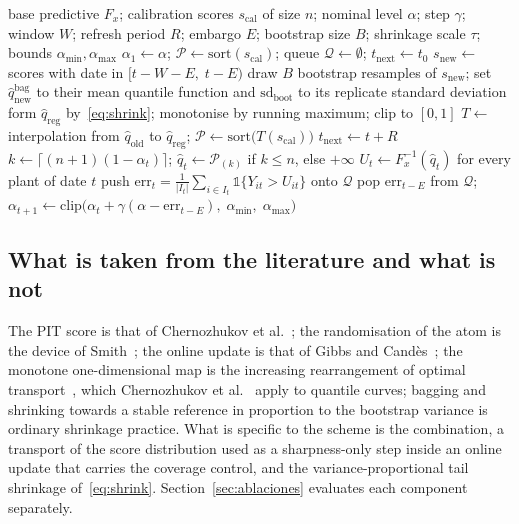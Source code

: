 \begin{algorithm}[t]
\caption{Transport + ACI with tail shrinkage. Constants and seeds in \ref{app:hiper}.}
\label{alg:transporte}
\begin{algorithmic}[1]
\Require base predictive $F_x$; calibration scores $s_{\mathrm{cal}}$ of size $n$; nominal level $\alpha$; step $\gamma$; window $W$; refresh period $R$; embargo $E$; bootstrap size $B$; shrinkage scale $\tau$; bounds $\alpha_{\min},\alpha_{\max}$
\State $\alpha_1\gets\alpha$; \; $\mathcal{P}\gets\mathrm{sort}(s_{\mathrm{cal}})$; \; queue $\mathcal{Q}\gets\emptyset$; \; $t_{\mathrm{next}}\gets t_0$
     \State $s_{\mathrm{new}}\gets$ scores with date in $[t-W-E,\;t-E)$
        \State draw $B$ bootstrap resamples of $s_{\mathrm{new}}$; set $\hat q^{\mathrm{bag}}_{\mathrm{new}}$ to their mean quantile function and $\mathrm{sd}_{\mathrm{boot}}$ to its replicate standard deviation
        \State form $\hat q_{\mathrm{reg}}$ by~\eqref{eq:shrink}; monotonise by running maximum; clip to $[0,1]$
        \State $T\gets$ interpolation from $\hat q_{\mathrm{old}}$ to $\hat q_{\mathrm{reg}}$; \; $\mathcal{P}\gets\mathrm{sort}\big(T(s_{\mathrm{cal}})\big)$
     \EndIf
     \State $t_{\mathrm{next}}\gets t+R$
  \EndIf
  \State $k\gets\lceil (n+1)(1-\alpha_t)\rceil$; \; $\hat q_t\gets \mathcal{P}_{(k)}$ if $k\le n$, else $+\infty$
  \State $U_t\gets F_x^{-1}(\hat q_t)$ for every plant of date $t$ 
  \State push $\mathrm{err}_t=\frac{1}{|I_t|}\sum_{i\in I_t}\mathbb{1}\{Y_{it}>U_{it}\}$ onto $\mathcal{Q}$
     \State pop $\mathrm{err}_{t-E}$ from $\mathcal{Q}$; \; $\alpha_{t+1}\gets\mathrm{clip}\big(\alpha_t+\gamma(\alpha-\mathrm{err}_{t-E}),\;\alpha_{\min},\;\alpha_{\max}\big)$
  \EndIf
\EndFor
\end{algorithmic}
\end{algorithm}

\subsection{What is taken from the literature and what is not}
\label{sec:novedad}

The PIT score is that of Chernozhukov et al.~\cite{chernozhukov2021}; the randomisation of the atom is the device of Smith~\cite{smith1985}; the online update is that of Gibbs and Cand\`es~\cite{gibbs2021}; the monotone one-dimensional map is the increasing rearrangement of optimal transport~\cite{peyre2019}, which Chernozhukov et al.~\cite{chernozhukov2010} apply to quantile curves; bagging and shrinking towards a stable reference in proportion to the bootstrap variance is ordinary shrinkage practice. What is specific to the scheme is the combination, a transport of the score distribution used as a sharpness-only step inside an online update that carries the coverage control, and the variance-proportional tail shrinkage of~\eqref{eq:shrink}. Section~\ref{sec:ablaciones} evaluates each component separately.

